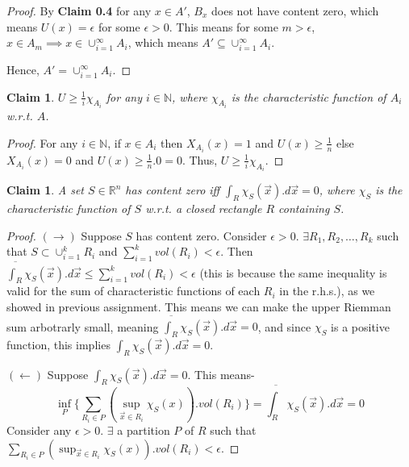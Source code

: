 \documentclass[12pt,a4paper]{article}
\newtheorem{claim}[theorem]{Claim}
\theoremstyle{definition}
\begin{document}
\begin{flushleft}
\begin{proof}
	\medskip

	By {\bf Claim 0.4} for any $x \in A'$, $B_x$ does not have content zero, which means $U(x) = \epsilon$ for some $\epsilon > 0$. This means for some $m > \epsilon$, $x \in A_m \implies x \in \cup_{i=1}^{\infty} A_i$, which means $A' \subseteq \cup_{i=1}^{\infty} A_i$.

	\medskip

	Hence, $A' = \cup_{i=1}^{\infty} A_i$.
\end{proof}

\begin{claim}
	$U \ge \frac{1}{i} \chi_{A_i}$ for any $i \in \mathbb{N}$, where $\chi_{A_i}$ is the characteristic function of $A_i$ w.r.t. $A$.
\end{claim}

\begin{proof}
	For any $i \in \mathbb{N}$, if $x \in A_i$ then $X_{A_i}(x) = 1$ and $U(x) \ge \frac{1}{n}$ else $X_{A_i}(x) = 0$ and $U(x) \ge \frac{1}{n}.0 = 0$. Thus, $U \ge \frac{1}{i} \chi_{A_i}$.
\end{proof}

\begin{claim}
	A set $S \in \mathbb{R}^n$ has content zero iff $\int_{R} \chi_{S} (\vec{x}).d\vec{x} = 0$, where $\chi_{S}$ is the characteristic function of $S$ w.r.t. a closed rectangle $R$ containing $S$. 
\end{claim}

\begin{proof}
	$(\rightarrow)$ Suppose $S$ has content zero. Consider $\epsilon > 0$. $\exists R_1,R_2,\dots,R_k$ such that $S \subset \cup_{i = 1}^{k} R_i$ and $\sum_{i = 1}^{k} vol(R_i) < \epsilon$. Then $\overline{\int_{R}} \chi_S (\vec{x}).d\vec{x} \le \sum_{i = 1}^{k} vol(R_i) < \epsilon$ (this is because the same inequality is valid for the sum of characteristic functions of each $R_i$ in the r.h.s.), as we showed in previous assignment. This means we can make the upper Riemman sum arbotrarly small, meaning $\overline{\int_{R}} \chi_S (\vec{x}).d\vec{x} = 0$, and since $\chi_{S}$ is a positive function, this implies $\int_{R} \chi_{S} (\vec{x}).d\vec{x} = 0$.

	\medskip

	$(\leftarrow)$ Suppose $\int_{R} \chi_{S} (\vec{x}).d\vec{x} = 0$. This means- $$\inf_{P} \{\sum_{R_i \in P} (\sup_{\vec{x} \in R_i} \chi_{S} (x) ).vol(R_i)\} = \overline{\int_{R}} \chi_S (\vec{x}).d\vec{x} = 0$$
	Consider any $\epsilon > 0$. $\exists$ a partition $P$ of $R$ such that $\sum_{R_i \in P} (\sup_{\vec{x} \in R_i} \chi_{S} (x)).vol(R_i) < \epsilon$.


\end{proof}
\end{flushleft}
\end{document}
